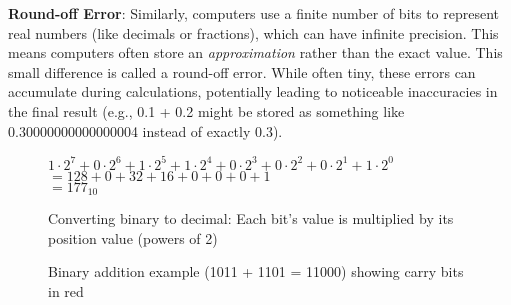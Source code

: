 \documentclass[11pt,oneside]{book}
\begin{document}
\textbf{Round-off Error}: Similarly, computers use a finite number of bits to represent real numbers (like decimals or fractions), which can have infinite precision. This means computers often store an \textit{approximation} rather than the exact value. This small difference is called a round-off error. While often tiny, these errors can accumulate during calculations, potentially leading to noticeable inaccuracies in the final result (e.g., 0.1 + 0.2 might be stored as something like 0.30000000000000004 instead of exactly 0.3).

\begin{figure}[h!]
    \centering
    
    \vspace{1em}
    $1 \cdot 2^7 + 0 \cdot 2^6 + 1 \cdot 2^5 + 1 \cdot 2^4 + 0 \cdot 2^3 + 0 \cdot 2^2 + 0 \cdot 2^1 + 1 \cdot 2^0$\\
    $= 128 + 0 + 32 + 16 + 0 + 0 + 0 + 1$\\
    $= 177_{10}$
    
    \caption{Converting binary to decimal: Each bit's value is multiplied by its position value (powers of 2)}
    \label{fig:binary-byte}
\end{figure}

\begin{figure}[h!]
    \centering
    \caption{Binary addition example (1011 + 1101 = 11000) showing carry bits in red}
    \label{fig:binary-addition}
\end{figure}
\end{document}

